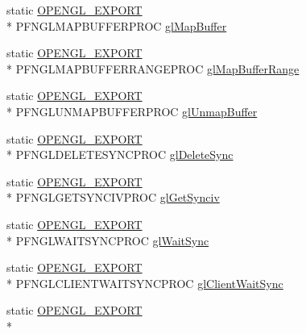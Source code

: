 \begin{DoxyCompactItemize}
\item 
static \hyperlink{_config_8h_a77401aa3bc0a379879047c1bd30f262e}{O\+P\+E\+N\+G\+L\+\_\+\+E\+X\+P\+O\+R\+T} \\*
P\+F\+N\+G\+L\+M\+A\+P\+B\+U\+F\+F\+E\+R\+P\+R\+O\+C \hyperlink{class_agmd_1_1_g_l_driver_a7433a71b089ed9f090048db2a0f25157}{gl\+Map\+Buffer}
\item 
static \hyperlink{_config_8h_a77401aa3bc0a379879047c1bd30f262e}{O\+P\+E\+N\+G\+L\+\_\+\+E\+X\+P\+O\+R\+T} \\*
P\+F\+N\+G\+L\+M\+A\+P\+B\+U\+F\+F\+E\+R\+R\+A\+N\+G\+E\+P\+R\+O\+C \hyperlink{class_agmd_1_1_g_l_driver_a5cab91ddf1cbffb27e38231b76fb6e89}{gl\+Map\+Buffer\+Range}
\item 
static \hyperlink{_config_8h_a77401aa3bc0a379879047c1bd30f262e}{O\+P\+E\+N\+G\+L\+\_\+\+E\+X\+P\+O\+R\+T} \\*
P\+F\+N\+G\+L\+U\+N\+M\+A\+P\+B\+U\+F\+F\+E\+R\+P\+R\+O\+C \hyperlink{class_agmd_1_1_g_l_driver_a02fa3989f3e3f4d10142d14ff5ac6918}{gl\+Unmap\+Buffer}
\item 
static \hyperlink{_config_8h_a77401aa3bc0a379879047c1bd30f262e}{O\+P\+E\+N\+G\+L\+\_\+\+E\+X\+P\+O\+R\+T} \\*
P\+F\+N\+G\+L\+D\+E\+L\+E\+T\+E\+S\+Y\+N\+C\+P\+R\+O\+C \hyperlink{class_agmd_1_1_g_l_driver_a3e439a92c87cae19fae168bb416c03fb}{gl\+Delete\+Sync}
\item 
static \hyperlink{_config_8h_a77401aa3bc0a379879047c1bd30f262e}{O\+P\+E\+N\+G\+L\+\_\+\+E\+X\+P\+O\+R\+T} \\*
P\+F\+N\+G\+L\+G\+E\+T\+S\+Y\+N\+C\+I\+V\+P\+R\+O\+C \hyperlink{class_agmd_1_1_g_l_driver_a0c2fb6781ddda597d26c15e21342d8dc}{gl\+Get\+Synciv}
\item 
static \hyperlink{_config_8h_a77401aa3bc0a379879047c1bd30f262e}{O\+P\+E\+N\+G\+L\+\_\+\+E\+X\+P\+O\+R\+T} \\*
P\+F\+N\+G\+L\+W\+A\+I\+T\+S\+Y\+N\+C\+P\+R\+O\+C \hyperlink{class_agmd_1_1_g_l_driver_a619b7422381e6ce3ad0b1c268a65dd3e}{gl\+Wait\+Sync}
\item 
static \hyperlink{_config_8h_a77401aa3bc0a379879047c1bd30f262e}{O\+P\+E\+N\+G\+L\+\_\+\+E\+X\+P\+O\+R\+T} \\*
P\+F\+N\+G\+L\+C\+L\+I\+E\+N\+T\+W\+A\+I\+T\+S\+Y\+N\+C\+P\+R\+O\+C \hyperlink{class_agmd_1_1_g_l_driver_a8afd0f38432cd425043d0ed1f1aa59c9}{gl\+Client\+Wait\+Sync}
\item 
static \hyperlink{_config_8h_a77401aa3bc0a379879047c1bd30f262e}{O\+P\+E\+N\+G\+L\+\_\+\+E\+X\+P\+O\+R\+T} \\*

\end{DoxyCompactItemize}
